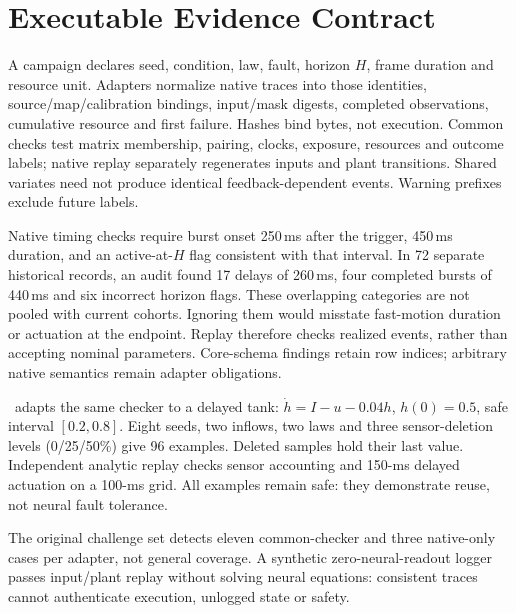 \section{Executable Evidence Contract}
A campaign declares seed, condition, law, fault, horizon $H$, frame duration and resource unit. Adapters normalize native traces into those identities, source/map/calibration bindings, input/mask digests, completed observations, cumulative resource and first failure. Hashes bind bytes, not execution. Common checks test matrix membership, pairing, clocks, exposure, resources and outcome labels; native replay separately regenerates inputs and plant transitions. Shared variates need not produce identical feedback-dependent events. Warning prefixes exclude future labels.

Native timing checks require burst onset 250\,ms after the trigger, 450\,ms duration, and an active-at-$H$ flag consistent with that interval. In 72 separate historical records, an audit found 17 delays of 260\,ms, four completed bursts of 440\,ms and six incorrect horizon flags. These overlapping categories are not pooled with current cohorts. Ignoring them would misstate fast-motion duration or actuation at the endpoint. Replay therefore checks realized events, rather than accepting nominal parameters. Core-schema findings retain row indices; arbitrary native semantics remain adapter obligations.

\reuseRef\ adapts the same checker to a delayed tank: $\dot h=I-u-0.04h$, $h(0)=0.5$, safe interval $[0.2,0.8]$. Eight seeds, two inflows, two laws and three sensor-deletion levels (0/25/50\%) give 96 examples. Deleted samples hold their last value. Independent analytic replay checks sensor accounting and 150-ms delayed actuation on a 100-ms grid. All examples remain safe: they demonstrate reuse, not neural fault tolerance.

The original challenge set detects eleven common-checker and three native-only cases per adapter, not general coverage. A synthetic zero-neural-readout logger passes input/plant replay without solving neural equations: consistent traces cannot authenticate execution, unlogged state or safety.
